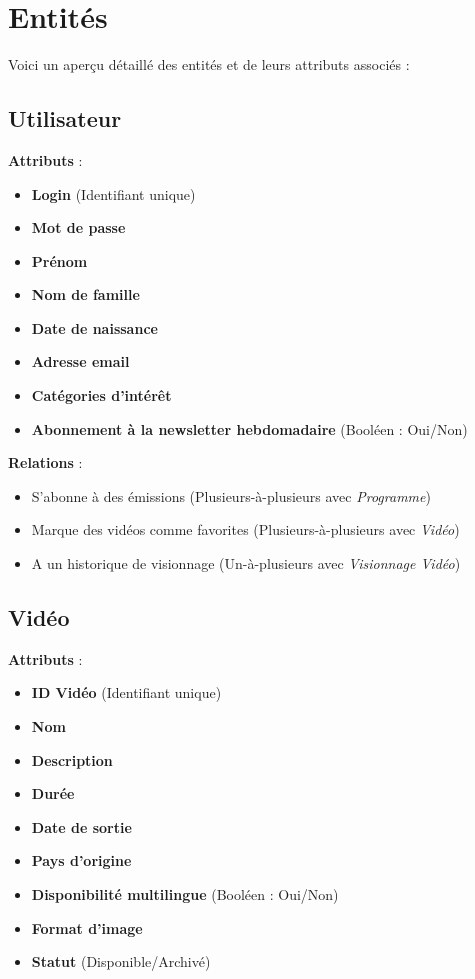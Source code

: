 \documentclass[a4paper,12pt]{article}
\begin{document}
\section{Entités}

Voici un aperçu détaillé des entités et de leurs attributs associés :

\subsection{Utilisateur}

\textbf{Attributs} :
\begin{itemize}
    \item \textbf{Login} (Identifiant unique)
    \item \textbf{Mot de passe}
    \item \textbf{Prénom}
    \item \textbf{Nom de famille}
    \item \textbf{Date de naissance}
    \item \textbf{Adresse email}
    \item \textbf{Catégories d'intérêt}
    \item \textbf{Abonnement à la newsletter hebdomadaire} (Booléen : Oui/Non)
\end{itemize}

\textbf{Relations} :
\begin{itemize}
    \item S'abonne à des émissions (Plusieurs-à-plusieurs avec \textit{Programme})
    \item Marque des vidéos comme favorites (Plusieurs-à-plusieurs avec \textit{Vidéo})
    \item A un historique de visionnage (Un-à-plusieurs avec \textit{Visionnage Vidéo})
\end{itemize}

\subsection{Vidéo}

\textbf{Attributs} :
\begin{itemize}
    \item \textbf{ID Vidéo} (Identifiant unique)
    \item \textbf{Nom}
    \item \textbf{Description}
    \item \textbf{Durée}
    \item \textbf{Date de sortie}
    \item \textbf{Pays d'origine}
    \item \textbf{Disponibilité multilingue} (Booléen : Oui/Non)
    \item \textbf{Format d'image}
    \item \textbf{Statut} (Disponible/Archivé)
\end{itemize}
\end{document}
